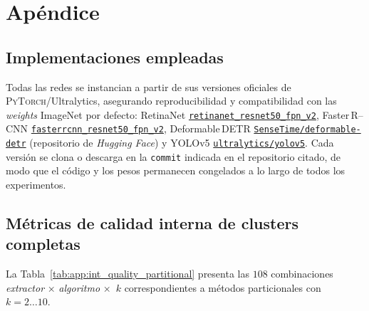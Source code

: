 \chapter{Apéndice}

\section{Implementaciones empleadas}
\label{sec:appendix_model_implementations}
Todas las redes se instancian a partir de sus versiones oficiales de \textsc{PyTorch}/Ultralytics, asegurando reproducibilidad y compatibilidad con las \textit{weights} ImageNet por defecto:
RetinaNet \href{https://pytorch.org/vision/main/models/generated/torchvision.models.detection.retinanet_resnet50_fpn_v2.html}{\texttt{retinanet\_resnet50\_fpn\_v2}},
Faster\,R--CNN \href{https://pytorch.org/vision/main/models/generated/torchvision.models.detection.fasterrcnn_resnet50_fpn_v2.html}{\texttt{fasterrcnn\_resnet50\_fpn\_v2}},
Deformable\,DETR \href{https://huggingface.co/SenseTime/deformable-detr}{\texttt{SenseTime/deformable-detr}} (repositorio de \textit{Hugging Face})
y YOLOv5 \href{https://github.com/ultralytics/yolov5}{\texttt{ultralytics/yolov5}}.
Cada versión se clona o descarga en la \texttt{commit} indicada en el repositorio citado, de modo que el código y los pesos permanecen congelados a lo largo de todos los experimentos.

\section{Métricas de calidad interna de clusters completas}
\label{sec:appendix_internal_metrics}

La Tabla~\ref{tab:app:int_quality_partitional} presenta las \(108\) combinaciones \textit{extractor} × \textit{algoritmo} ×~\(k\) correspondientes a métodos particionales con \(k=2\ldots10\).

